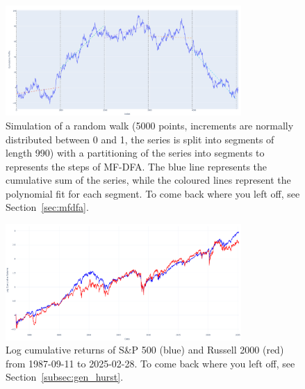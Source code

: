 \documentclass[11pt]{extarticle}
\begin{document}
\begin{figure}[ht]
    \centering
    \includegraphics[width=0.8\textwidth]{img/cumulative_profile_segment_partitioning.png}
    \caption{Simulation of a random walk (5000 points, increments are normally distributed between 0 and 1, the series is
    split into segments of length 990) with a
    partitioning of the series into segments to represents the steps of MF-DFA.
        The blue line represents the cumulative sum of the series, while the coloured lines represent the polynomial fit for
    each segment. To come back where you left off, see Section~\ref{sec:mfdfa}.}
    \label{fig:cumulative_profile_segment_partitioning}
\end{figure}
\FloatBarrier

\begin{figure}[ht]
    \centering
    \includegraphics[width=0.8\textwidth]{img/log_cumulative_returns.png}
    \caption{Log cumulative returns of S\&P 500 (blue) and Russell 2000 (red) from 1987-09-11 to 2025-02-28.
    To come back where you left off, see Section~\ref{subsec:gen_hurst}.}
    \label{fig:cumulative_returns}
\end{figure}


\FloatBarrier
\end{document}
